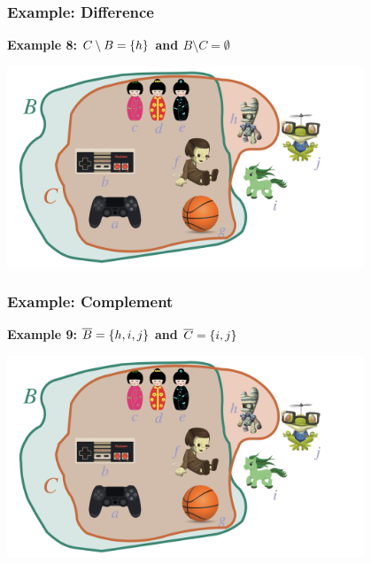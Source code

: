 \documentclass[fleqn,10pt,serif,xcolor=svgnames,xcolor=table,aspectratio=169]{beamer}
\begin{document}
\begin{frame}
  \frametitle{Example: Difference}

  \hfill \textbf{Example 8: $C \setminus B = \left\{h\right\}$ and $B \setminus C = \emptyset$} \\

  \bigskip

  \hfill \includegraphics[width = 0.8\textwidth]{01b-sets-relations-operations/01b-sets-relations-operations-002.jpeg}

\end{frame}

\begin{frame}
  \frametitle{Example: Complement}

  \hfill \textbf{Example 9: $\overline{B} = \left\{h, i , j\right\}$ and $\overline{C} = \left\{i,j\right\}$} \\

  \bigskip

  \hfill \includegraphics[width = 0.8\textwidth]{01b-sets-relations-operations/01b-sets-relations-operations-002.jpeg}

\end{frame}
\end{document}
